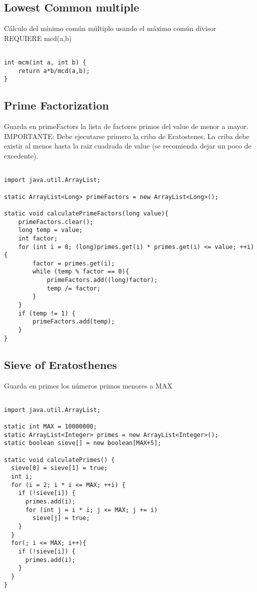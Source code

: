 \documentclass[11pt,letterpaper,twocolumn,twosided]{article}
\begin{document}
\subsection{Lowest Common multiple}
C\'alculo del m\'inimo com\'un m\'ultiplo usando el m\'aximo com\'un divisor REQUIERE mcd(a,b)

\begin{lstlisting}

int mcm(int a, int b) {
	return a*b/mcd(a,b);
}
\end{lstlisting}

\subsection{Prime Factorization}
Guarda en primeFactors la lista de factores primos del value de menor a mayor. IMPORTANTE: Debe ejecutarse primero la criba de Eratostenes.  La criba debe existir al menos hasta la raiz cuadrada de value (se  recomienda dejar un poco de excedente).

\begin{lstlisting}

import java.util.ArrayList;

static ArrayList<Long> primeFactors = new ArrayList<Long>();

static void calculatePrimeFactors(long value){
	primeFactors.clear();
	long temp = value;
	int factor;
	for (int i = 0; (long)primes.get(i) * primes.get(i) <= value; ++i){
		factor = primes.get(i);
		while (temp % factor == 0){
			primeFactors.add((long)factor);
			temp /= factor;
		}
	}
	if (temp != 1) {
		primeFactors.add(temp);
	}
}
\end{lstlisting}

\subsection{Sieve of Eratosthenes}
Guarda en primes los n\'umeros primos menores a MAX

\begin{lstlisting}

import java.util.ArrayList;

static int MAX = 10000000;
static ArrayList<Integer> primes = new ArrayList<Integer>();
static boolean sieve[] = new boolean[MAX+5];
	
static void calculatePrimes() {
  sieve[0] = sieve[1] = true;
  int i;
  for (i = 2; i * i <= MAX; ++i) {
    if (!sieve[i]) {
      primes.add(i);
      for (int j = i * i; j <= MAX; j += i)
        sieve[j] = true;
    }
  }
  for(; i <= MAX; i++){
  	if (!sieve[i]) {
      primes.add(i);
    }
  }
}
\end{lstlisting}
\end{document}
